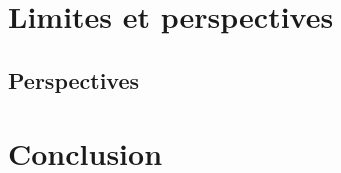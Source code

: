 \documentclass[../main]{subfiles}
\begin{document}
\section{Limites et perspectives}




\subsection{Perspectives}

\section{Conclusion}


\ifSubfilesClassLoaded{
    \printbibliography
}{}
\end{document}
